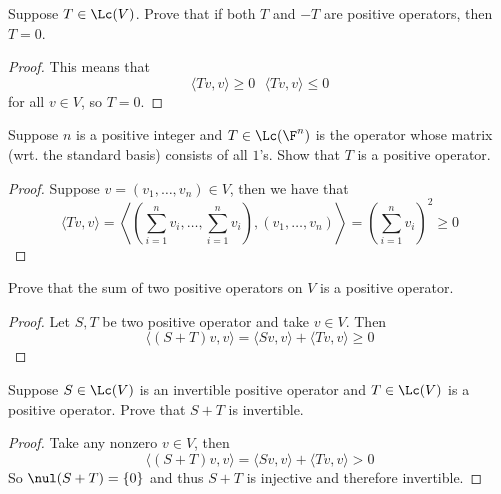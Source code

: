 \documentclass{extarticle}
\begin{document}

\newpage
{}

\begin{problem}{1}
    Suppose \(T \in \Lc(V)\). Prove that if both \(T\) and \(-T\) are positive operators, then
    \(T = 0\).
\end{problem}

\begin{proof}
This means that
\[\langle Tv,v \rangle \geq 0 \ \ \ \langle Tv,v \rangle \leq 0\]
for all \(v \in V\), so \(T = 0\).
\end{proof}

\begin{problem}{3}
    Suppose \(n\) is a positive integer and \(T \in \Lc(\F^n)\) is the operator whose matrix (wrt.
    the standard basis) consists of all \(1\)'s. Show that \(T\) is a positive operator.
\end{problem}

\begin{proof}
Suppose \(v = (v_1, \ldots, v_n) \in V\), then we have that
\[\langle Tv,v \rangle
= \left\langle \left(\sum_{i=1}^{n} v_i, \ldots, \sum_{i=1}^{n} v_i \right), (v_1, \ldots, v_n) \right\rangle
= \left(\sum_{i=1}^{n} v_i \right)^2 \geq 0\]
\end{proof}

\begin{problem}{6}
    Prove that the sum of two positive operators on \(V\) is a positive operator.
\end{problem}

\begin{proof}
Let \(S, T\) be two positive operator and take \(v \in V\). Then
\[\langle (S+T)v,v \rangle = \langle Sv,v \rangle + \langle Tv,v \rangle \geq 0\]
\end{proof}

\begin{problem}{7}
    Suppose \(S \in \Lc(V)\) is an invertible positive operator and \(T \in \Lc(V)\) is a positive
    operator. Prove that \(S + T\) is invertible.
\end{problem}

\begin{proof}
Take any nonzero \(v \in V\), then
\[\langle (S+T)v,v \rangle = \langle Sv,v \rangle + \langle Tv,v \rangle > 0\]
So \(\nul (S+T) = \{0\}\) and thus \(S+T\) is injective and therefore invertible.
\end{proof}
\end{document}
